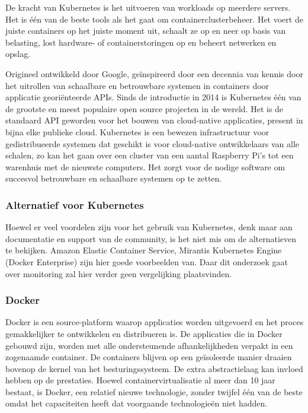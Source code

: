 De kracht van Kubernetes is het uitvoeren van workloads op meerdere servers. Het is één van de beste tools als het gaat om containerclusterbeheer. Het voert de juiste containers op het juiste moment uit, schaalt ze op en neer op basis van belasting, lost hardware- of containerstoringen op en beheert netwerken en opslag. \autocite{Rancher2020}

Origineel ontwikkeld door Google, geïnspireerd door een decennia van kennis door het uitrollen van schaalbare en betrouwbare systemen in containers door applicatie georiënteerde APIs. Sinds de introductie in 2014 is Kubernetes één van de grootste en meest populaire open source projecten in de wereld. Het is de standaard API geworden voor het bouwen van cloud-native applicaties, present in bijna elke publieke cloud. Kubernetes is een bewezen infrastructuur voor gedistribueerde systemen dat geschikt is voor cloud-native ontwikkelaars van alle schalen, zo kan het gaan over een cluster van een aantal Raspberry Pi's tot een warenhuis met de nieuwste computers. Het zorgt voor de nodige software om succesvol betrouwbare en schaalbare systemen op te zetten. \autocite{Burns2019}


\subsubsection{Alternatief voor Kubernetes}
Hoewel er veel voordelen zijn voor het gebruik van Kubernetes, denk maar aan documentatie en support van de community, is het niet mis om de alternatieven te bekijken. Amazon Elastic Container Service, Mirantis Kubernetes Engine (Docker Enterprise) zijn hier goede voorbeelden van. Daar dit onderzoek gaat over monitoring zal hier verder geen vergelijking plaatsvinden.

\subsubsection{Docker}
Docker is een source-platform waarop applicaties worden uitgevoerd en het proces gemakkelijker te ontwikkelen en distribueren is. De applicaties die in Docker gebouwd zijn, worden met alle ondersteunende afhankelijkheden verpakt in een zogenaamde container. De containers blijven op een geïsoleerde manier draaien bovenop de kernel van het besturingssysteem. De extra abstractielaag kan invloed hebben op de prestaties. Hoewel containervirtualisatie al meer dan 10 jaar bestaat, is Docker, een relatief nieuwe technologie, zonder twijfel één van de beste omdat het capaciteiten heeft dat voorgaande technologieën niet hadden. \autocite{Rad2017}

